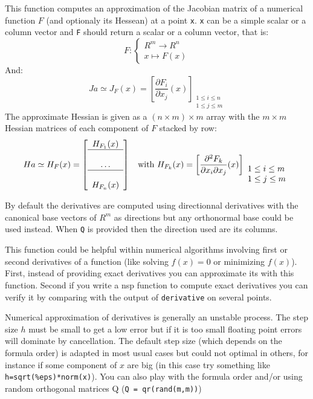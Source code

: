\begin{mandescription}

This function computes an approximation of the Jacobian matrix of a numerical
function $F$ (and optionaly its Hessean) at a point \verb+x+. \verb+x+
can be a simple scalar or a column vector and \verb+F+ should return a 
scalar or a column vector, that is: 
$$
    F: \left\{\begin{array}{l} R^m \rightarrow R^n  \\ 
                               x \longmapsto F(x) 
              \end{array} \right.
$$
And:
$$
    Ja \simeq J_F(x) = \left[ \frac{\partial F_i}{\partial x_j}(x)  
                      \right]_{\begin{array}{l}1 \le i \le n\\1\le j
                          \le m \end{array}}
$$
The approximate Hessian is given as a $(n \times m) \times m$ array
with the $m \times m$ Hessian matrices of each component of $F$
stacked by row:
$$
   Ha  \simeq H_F(x) = \left[ \begin{array}{c} H_{F_1}(x) \\ \hline \\ \dots
     \\ \hline \\  H_{F_n}(x) \end{array} \right] \;\; \mbox{ with }
   H_{F_k}(x) =  \left[  \frac{\partial^2 F_k}{\partial x_i \partial x_j}(x)   
                \right]_{\begin{array}{l}1 \le i \le m\\1\le j
                          \le m \end{array}}
$$

By default the derivatives are computed using directionnal derivatives
with the canonical base vectors of $R^m$ as directions
but any orthonormal base could be used instead. When \verb+Q+ is
provided then the direction used are its columns.

This function could be helpful within numerical algorithms involving
first or second derivatives of a function (like solving $f(x)=0$
or minimizing $f(x)$). First, instead of providing exact derivatives
you can approximate its with this function. Second if you write a
nsp function to compute exact derivatives you can verify it
by comparing with the output of \verb+derivative+ on several points.

Numerical approximation of derivatives is generally an unstable process.  
The step size $h$ must be small to get a low error but if it is too small floating  
point errors will dominate by cancellation. The default step size
(which depends on the formula order) is adapted in most usual cases 
but could not optimal in others, for instance if some component of $x$
are big (in this case try something like \verb+h=sqrt(%eps)*norm(x)+). 
You can also play with the formula order and/or
using random orthogonal matrices Q (\verb+Q = qr(rand(m,m))+)


\end{mandescription}

